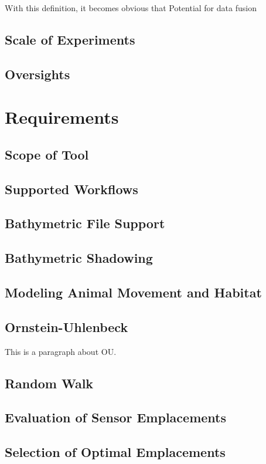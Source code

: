 With this definition, it becomes obvious that 
Potential for data fusion




\subsection{Scale of Experiments}


\subsection{Oversights}


\section{Requirements}
\subsection{Scope of Tool}
\subsection{Supported Workflows}
\subsection{Bathymetric File Support}
\subsection{Bathymetric Shadowing}
\subsection{Modeling Animal Movement and Habitat}
\subsection{Ornstein-Uhlenbeck}
This is a paragraph about OU.
\subsection{Random Walk}
\subsection{Evaluation of Sensor Emplacements}
\subsection{Selection of Optimal Emplacements}


